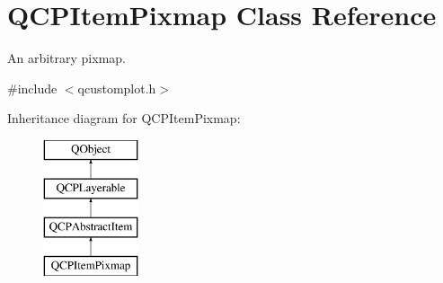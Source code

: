 \hypertarget{class_q_c_p_item_pixmap}{}\section{Q\+C\+P\+Item\+Pixmap Class Reference}
\label{class_q_c_p_item_pixmap}


An arbitrary pixmap.  




{\ttfamily \#include $<$qcustomplot.\+h$>$}

Inheritance diagram for Q\+C\+P\+Item\+Pixmap\+:\begin{figure}[H]
\begin{center}
\leavevmode
\includegraphics[height=4.000000cm]{class_q_c_p_item_pixmap}
\end{center}
\end{figure}
